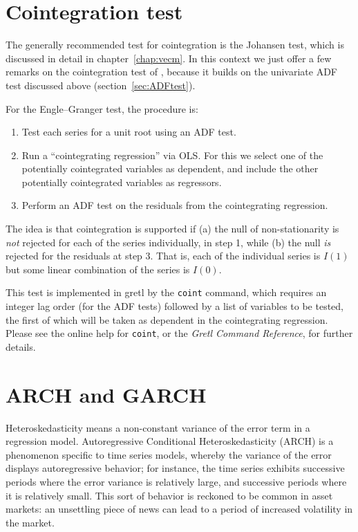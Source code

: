 \section{Cointegration test}
\label{sec:coint-test}

The generally recommended test for cointegration is the Johansen test,
which is discussed in detail in chapter~\ref{chap:vecm}. In this
context we just offer a few remarks on the cointegration test of
\cite{engle-granger87}, because it builds on the univariate ADF test 
discussed above (section~\ref{sec:ADFtest}).

For the Engle--Granger test, the procedure is:
\begin{enumerate}
\item Test each series for a unit root using an ADF test.
\item Run a ``cointegrating regression'' via OLS. For this we select
  one of the potentially cointegrated variables as dependent, and
  include the other potentially cointegrated variables as regressors.
\item Perform an ADF test on the residuals from the cointegrating
  regression.
\end{enumerate}

The idea is that cointegration is supported if (a) the null of
non-stationarity is \emph{not} rejected for each of the series
individually, in step 1, while (b) the null \emph{is} rejected for the
residuals at step 3. That is, each of the individual series is $I(1)$
but some linear combination of the series is $I(0)$.  

This test is implemented in gretl by the \texttt{coint} command,
which requires an integer lag order (for the ADF tests) followed by a
list of variables to be tested, the first of which will be taken as
dependent in the cointegrating regression. Please see the online help
for \texttt{coint}, or the \textit{Gretl Command Reference}, for
further details.


\section{ARCH and GARCH}
\label{sec:arch-garch}

Heteroskedasticity means a non-constant variance of the error term in
a regression model.  Autoregressive Conditional Heteroskedasticity
(ARCH) is a phenomenon specific to time series models, whereby the
variance of the error displays autoregressive behavior; for instance,
the time series exhibits successive periods where the error variance
is relatively large, and successive periods where it is relatively
small.  This sort of behavior is reckoned to be common in asset
markets: an unsettling piece of news can lead to a period of increased
volatility in the market.

